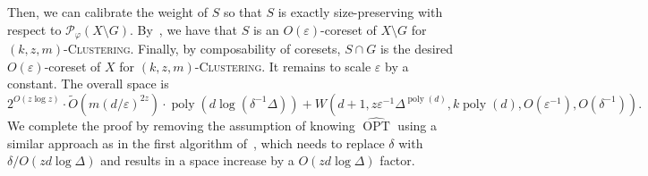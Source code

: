 \documentclass[letterpaper,11pt]{article}
\theoremstyle{plain}
\theoremstyle{definition}
\theoremstyle{remark}
\DeclareMathOperator{\poly}{poly}
\DeclareMathOperator{\OPT}{OPT}
\newcommand{\GOPT}{\widehat{\OPT}}
\newcommand{\eps}{\varepsilon}
\renewcommand{\phi}{\varphi}
\newcommand{\calP}{\mathcal{P}}
\newcommand{\ProblemName}[1]{\textsc{#1}}
\newcommand{\kzmC}{\ProblemName{$(k,z,m)$-Clustering}\xspace}
\begin{document}
Then, we can calibrate the weight of $S$ so that $S$ is exactly size-preserving with respect to $\calP_\phi(X\setminus G)$. By~, we have that $S$ is an $O(\eps)$-coreset of $X\setminus G$ for \kzmC. 
Finally, by composability of coresets, $S\cap G$ is the desired $O(\eps)$-coreset of $X$ for \kzmC. It remains to scale $\eps$ by a constant. The overall space is 
\begin{equation*}
    2^{O(z\log z)}\cdot\tilde O(m(d/\eps)^{2z})\cdot \poly(d\log(\delta^{-1}\Delta))+ W\left(d+1, z\eps^{-1}\Delta^{\poly(d)}, k\poly(d), O(\eps^{-1}), O(\delta^{-1})\right).
\end{equation*}
We complete the proof by removing the assumption of knowing $\GOPT$ using a similar approach as in the first algorithm of~, which needs to replace $\delta$ with $\delta/O(zd\log\Delta)$ and results in a space increase by a $O(zd\log\Delta)$ factor.























%
 






\end{document}
